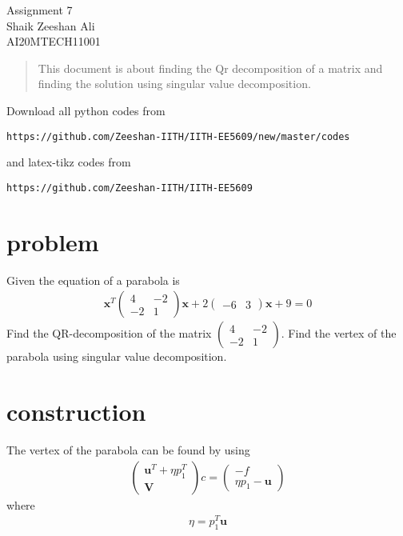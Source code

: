 \documentclass[journal,12pt,twocolumn]{IEEEtran}
\newcommand{\myvec}[1]{\ensuremath{\begin{pmatrix}#1\end{pmatrix}}}
\numberwithin{equation}{subsection}
\let\vec\mathbf
\begin{document}
\begin{center}
\huge Assignment 7\\

\large Shaik Zeeshan Ali\\
\large AI20MTECH11001\\
\end{center}
\begin{abstract}
This document is about finding the Qr decomposition of a matrix and finding the solution using singular value decomposition.
\end{abstract}
Download all python codes from 
\begin{lstlisting}
https://github.com/Zeeshan-IITH/IITH-EE5609/new/master/codes
\end{lstlisting}

and latex-tikz codes from 
\begin{lstlisting}
https://github.com/Zeeshan-IITH/IITH-EE5609
\end{lstlisting}
\section{problem}
Given the equation of a parabola is
\begin{align}
    \vec{x}^T\myvec{4&-2\\-2&1}\vec{x}+2\myvec{-6&3}\vec{x}+9=0
\end{align}
Find the QR-decomposition of the matrix $\myvec{4&-2\\-2&1}$.
Find the vertex of the parabola using singular value decomposition.
\section{construction}
The vertex of the parabola can be found by using
\begin{align}
    \myvec{\vec{u}^T+\eta p_1^T\\\vec{V}}c=\myvec{-f\\\eta p_1-\vec{u}}
\end{align}
where
\begin{align}
    \eta=p_1^T\vec{u}
\end{align}
\end{document}
